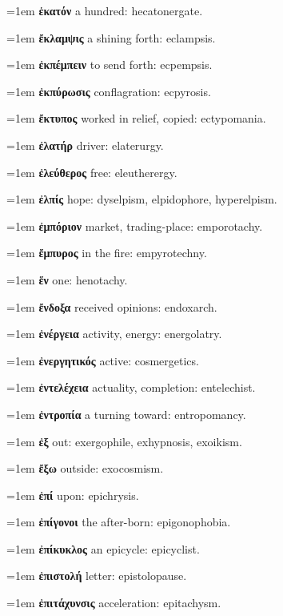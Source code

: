 \hangindent=1em \textbf{ἑκατόν} a hundred: hecatonergate.\par
\hangindent=1em \textbf{ἔκλαμψις} a shining forth: eclampsis.\par
\hangindent=1em \textbf{ἐκπέμπειν} to send forth: ecpempsis.\par
\hangindent=1em \textbf{ἐκπύρωσις} conflagration: ecpyrosis.\par
\hangindent=1em \textbf{ἔκτυπος} worked in relief, copied: ectypomania.\par
\hangindent=1em \textbf{ἐλατήρ} driver: elaterurgy.\par
\hangindent=1em \textbf{ἐλεύθερος} free: eleutherergy.\par
\hangindent=1em \textbf{ἐλπίς} hope: dyselpism, elpidophore, hyperelpism.\par
\hangindent=1em \textbf{ἐμπόριον} market, trading-place: emporotachy.\par
\hangindent=1em \textbf{ἔμπυρος} in the fire: empyrotechny.\par
\hangindent=1em \textbf{ἕν} one: henotachy.\par
\hangindent=1em \textbf{ἔνδοξα} received opinions: endoxarch.\par
\hangindent=1em \textbf{ἐνέργεια} activity, energy: energolatry.\par
\hangindent=1em \textbf{ἐνεργητικός} active: cosmergetics.\par
\hangindent=1em \textbf{ἐντελέχεια} actuality, completion: entelechist.\par
\hangindent=1em \textbf{ἐντροπία} a turning toward: entropomancy.\par
\hangindent=1em \textbf{ἐξ} out: exergophile, exhypnosis, exoikism.\par
\hangindent=1em \textbf{ἔξω} outside: exocosmism.\par
\hangindent=1em \textbf{ἐπί} upon: epichrysis.\par
\hangindent=1em \textbf{ἐπίγονοι} the after-born: epigonophobia.\par
\hangindent=1em \textbf{ἐπίκυκλος} an epicycle: epicyclist.\par
\hangindent=1em \textbf{ἐπιστολή} letter: epistolopause.\par
\hangindent=1em \textbf{ἐπιτάχυνσις} acceleration: epitachysm.\par
